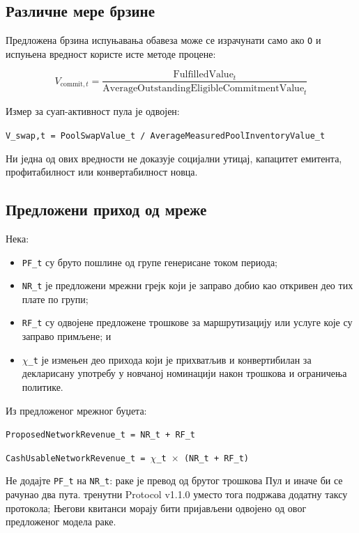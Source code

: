 \documentclass[11pt]{article}
\begin{document}
\subsection*{Различне мере брзине}

Предложена брзина испуњавања обавеза може се израчунати само ако \texttt{O} и испуњена вредност користе исте методе процене:

\[
V_{\mathrm{commit},t} = \frac{\mathrm{FulfilledValue}_t}{\mathrm{AverageOutstandingEligibleCommitmentValue}_t}
\]

Измер за суап-активност пула је одвојен:

\texttt{V\_swap,t = PoolSwapValue\_t / AverageMeasuredPoolInventoryValue\_t}

Ни једна од ових вредности не доказује социјални утицај, капацитет емитента, профитабилност или конвертабилност новца.

\subsection*{Предложени приход од мреже}

Нека:

\begin{itemize}[leftmargin=*]
\item \texttt{PF\_t} су бруто пошлине од групе генерисане током периода;
\item \texttt{NR\_t} је предложени мрежни грејк који је заправо добио као откривен део тих плате по групи;
\item \texttt{RF\_t} су одвојене предложене трошкове за маршрутизацију или услуге које су заправо примљене; и
\item \texttt{$\chi$\_t} је измењен део прихода који је прихватљив и конвертибилан за декларисану употребу у новчаној номинацији након трошкова и ограничења политике.
\end{itemize}
Из предложеног мрежног буџета:

\texttt{ProposedNetworkRevenue\_t = NR\_t + RF\_t}

\texttt{CashUsableNetworkRevenue\_t = $\chi$\_t $\times$ (NR\_t + RF\_t)}

Не додајте \texttt{PF\_t} на \texttt{NR\_t}: раке је превод од брутог трошкова Пул и иначе би се рачунао два пута. тренутни Protocol v1.1.0 уместо тога подржава додатну таксу протокола; Његови квитанси морају бити пријављени одвојено од овог предложеног модела раке.
\end{document}
